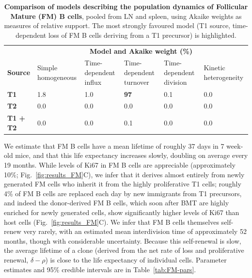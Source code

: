 \documentclass[12pt]{article}
\begin{document}
	\begin{table}[htbp]
		\begin{center}
			\renewcommand{\arraystretch}{1.25}
			{\small
			\begin{tabular}{p{1.5cm} p{2.2 cm} p{2.2cm} p{2.2cm} p{2.2cm} p{2.1cm}} 
				\toprule 
				& \multicolumn{5}{c}{\textbf{Model and Akaike weight (\%)}} \\
				\cline{2-6}
				\textbf{Source} & Simple homogeneous & Time-dependent influx & Time-dependent turnover  &  Time-dependent division &  Kinetic heterogeneity \\ 
				\toprule
				\textbf{T1}      &   1.8           &              1.0           & \cellcolor{blue!15} \textbf{ 97} &          0.1        &      0.0     \\ 
				\textbf{T2}      &   0.0           &              0.0           &             0.0                  &          0.0        &      0.0     \\ 
				\textbf{T1 + T2 }&   0.0           &              0.0           &             0.1                  &          0.0        &      0.0     \\ 
				\hline
				\toprule 
			\end{tabular}
			}
		\end{center}
		\caption{ \textbf{Comparison of models describing the population dynamics of Follicular Mature (FM) B cells}, pooled from LN and spleen, using Akaike weights as measures of relative support. The most strongly favoured model (T1 source, time-dependent loss of FM B cells deriving from a T1 precursor) is highlighted.
		}
		\label{tab:FM-AICs}
	\end{table} 
	
	
We estimate that FM B cells  have a mean lifetime of roughly 37 days in 7 week-old mice, and that this life expectancy increases slowly, doubling on average every 19 months. While levels of Ki67 in FM B cells are appreciable (approximately 10\%; Fig.~\ref{fig:results_FM}C), we infer that it derives almost entirely from newly generated FM cells who inherit it from the highly proliferative T1 cells; roughly 4\% of FM B cells are replaced each day by new immigrants from T1 precursors, and indeed the donor-derived FM B cells, which soon after BMT are highly enriched for newly generated cells, show significantly higher levels of Ki67 than host cells (Fig.~\ref{fig:results_FM}C).  We infer that FM B cells themselves self-renew very rarely, with an estimated mean interdivision time of approximately 52 months, though with considerable uncertainty.  Because this self-renewal  is slow, the average lifetime of a clone (derived from the net rate of loss and proliferative renewal, $\delta-\rho$) is close to the life expectancy of individual cells. Parameter estimates and 95\% credible intervals are in Table~\ref{tab:FM-pars}.
	
\end{document}
